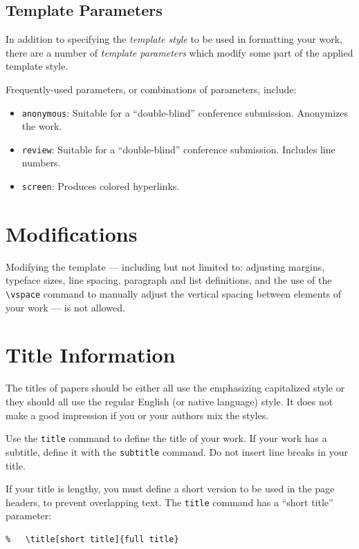 \documentclass[
]{ceurart}
\begin{document}
\subsection{Template Parameters}

In addition to specifying the \textit{template style} to be used in
formatting your work, there are a number of \textit{template parameters}
which modify some part of the applied template style.

Frequently-used parameters, or combinations of parameters, include:
\begin{itemize}
\item {\verb|anonymous|}: Suitable for a ``double-blind''
  conference submission. Anonymizes the work.
\item {\verb|review|}: Suitable for a ``double-blind''
  conference submission. Includes line
  numbers.
\item{\verb|screen|}: Produces colored hyperlinks.
\end{itemize}

\section{Modifications}

Modifying the template --- including but not limited to: adjusting
margins, typeface sizes, line spacing, paragraph and list definitions,
and the use of the \verb|\vspace| command to manually adjust the
vertical spacing between elements of your work --- is not allowed.

\section{Title Information}

The titles of papers should be either all use the emphasizing
capitalized style or they should all use the regular English (or
native language) style. It does not make a good impression if you or
your authors mix the styles.

Use the {\verb|title|} command to define the title of your work. If
your work has a subtitle, define it with the {\verb|subtitle|}
command.  Do not insert line breaks in your title.

If your title is lengthy, you must define a short version to be used
in the page headers, to prevent overlapping text. The \verb|title|
command has a ``short title'' parameter:
\begin{verbatim}
%   \title[short title]{full title}
\end{verbatim}
\end{document}
